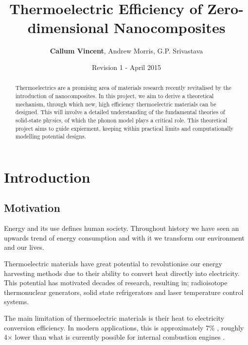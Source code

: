 \documentclass[12pt,titlepage,draft]{article}
\begin{document}
\title{Thermoelectric Efficiency of Zero-dimensional Nanocomposites}
\author{\textbf{Callum Vincent}, Andrew Morris, G.P. Srivastava}
\date{Revision 1 - April 2015}
\maketitle

\tableofcontents

\begin{abstract}

Thermoelectrics are a promising area of materials research recently revitalised by the introduction of nanocomposites. In this project, we aim to derive a theoretical mechanism, through which new, high efficiency thermoelectric materials can be designed. This will involve a detailed understanding of the fundamental theories of solid-state physics, of which the phonon model plays a critical role. This theoretical project aims to guide expierment, keeping within practical limits and computationally modelling potential designs.
\end{abstract}


\section{Introduction}
% 
\subsection{Motivation}
Energy and its use defines human society. Throughout history we have seen an upwards trend of energy consumption and with it we transform our environment and our lives.

Thermoelectric materials have great potential to revolutionise our energy harvesting methods due to their ability to convert heat directly into electricity. This potential has motivated decades of research, resulting in;  radioisotope thermonuclear generators, solid state refrigerators and laser temperature control systems.

The main limitation of thermoelectric materials is their heat to electricity conversion efficiency. In modern applications, this is approximately 7\% \cite{modern-thermoelectrics}, roughly 4$\times$ lower than what is currently possible for internal combustion engines \cite{engine-efficiency}.
\end{document}
